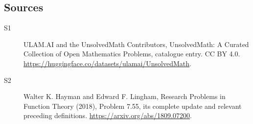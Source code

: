 \documentclass[11pt]{article}
\begin{document}
\subsection{Sources}
\begin{description}
\item[\hypertarget{source:statement:1}{S1}] ULAM.AI and the UnsolvedMath Contributors, UnsolvedMath: A Curated Collection of Open Mathematics Problems, catalogue entry. CC BY 4.0. \url{https://huggingface.co/datasets/ulamai/UnsolvedMath}.
\item[\hypertarget{source:statement:2}{S2}] Walter K. Hayman and Edward F. Lingham, Research Problems in Function Theory (2018), Problem 7.55, its complete update and relevant preceding definitions. \url{https://arxiv.org/abs/1809.07200}.
\end{description}
\label{end:statement}
\end{document}
